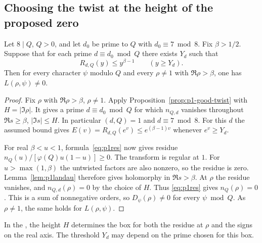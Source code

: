 \subsection{Choosing the twist at the height of the proposed zero}
\begin{theorem}\label{thm:p1criterion}
Let $8\mid Q$, $Q>0$, and let $d_0$ be prime to $Q$ with $d_0\equiv7\bmod 8$. Fix $\beta>1/2$. Suppose that for each prime $d\equiv d_0\bmod Q$ there exists $Y_d$ such that
\[
 R_{d,Q}(y)\le y^{\beta-1}\qquad(y\ge Y_d).
\]
Then for every character $\psi$ modulo $Q$ and every $\rho\ne1$ with $\Re\rho>\beta$, one has $L(\rho,\psi)\ne0$.
\end{theorem}
\begin{proof}
Fix $\rho$ with $\Re\rho>\beta$, $\rho\ne1$. Apply Proposition~\ref{prop:p1-good-twist} with $H=|\Im\rho|$. It gives a prime $d\equiv d_0\bmod Q$ for which $n_{Q,d}$ vanishes throughout $\Re s\ge\beta$, $|\Im s|\le H$. In particular $(d,Q)=1$ and $d\equiv7\bmod 8$. For this $d$ the assumed bound gives $E(v)=R_{d,Q}(e^v)\le e^{(\beta-1)v}$ whenever $e^v\ge Y_d$.

For real $\beta<u<1$, formula~\eqref{eq:p1res} now gives residue $n_Q(u)/[\varphi(Q)u(1-u)]\ge0$. The transform is regular at $1$. For $u>\max(1,\beta)$ the untwisted factors are also nonzero, so the residue is zero. Lemma~\ref{lem:p1landau} therefore gives holomorphy in $\Re s>\beta$. At $\rho$ the residue vanishes, and $n_{Q,d}(\rho)=0$ by the choice of $H$. Thus \eqref{eq:p1res} gives $n_Q(\rho)=0$. This is a sum of nonnegative orders, so $D_\psi(\rho)\ne0$ for every $\psi\bmod Q$. As $\rho\ne1$, the same holds for $L(\rho,\psi)$.
\end{proof}
In the , the height $H$ determines the box for both the residue at $\rho$ and the signs on the real axis. The threshold $Y_d$ may depend on the prime chosen for this box.

